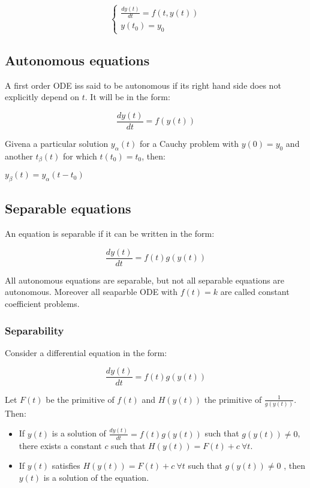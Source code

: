   $$\begin{cases}
    \frac{dy(t)}{dt} = f(t, y(t))\\
    y(t_0) = y_0
  \end{cases}$$

  \subsection{Autonomous equations}
  A first order ODE iss said to be autonomous if its right hand side does not explicitly depend on $t$.
  It will be in the form:

  $$\frac{dy(t)}{dt} = f(y(t))$$

  Givena a particular solution $y_\alpha(t)$ for a Cauchy problem with $y(0) = y_0$ and another $t_\beta(t)$ for which $t(t_0) = t_0$, then:

  $y_\beta(t) = y_\alpha(t - t_0)$

  \subsection{Separable equations}
  An equation is separable if it can be written in the form:

  $$\frac{dy(t)}{dt} = f(t)g(y(t))$$

  All autonomous equations are separable, but not all separable equations are autonomous.
  Moreover all seaparble ODE with $f(t) = k$ are called constant coefficient problems.

    \subsubsection{Separability}
    Consider a differential equation in the form:

    $$\frac{dy(t)}{dt} = f(t)g(y(t))$$

    Let $F(t)$ be the primitive of $f(t)$ and $H(y(t))$ the primitive of $\frac{1}{g(y(t))}$.
    Then:

    \begin{multicols}{2}
      \begin{itemize}
        \item If $y(t)$ is a solution of $\frac{dy(t)}{dt} = f(t)g(y(t))$ such that $g(y(t))\neq 0$, there exists a constant $c$ such that $H(y(t)) = F(t) + c\ \forall t$.
        \item If $y(t)$ satisfies $H(y(t)) = F(t) + c\ \forall t$ such that $g(y(t))\neq 0$ , then $y(t)$ is a solution of the equation.
      \end{itemize}
    \end{multicols}

